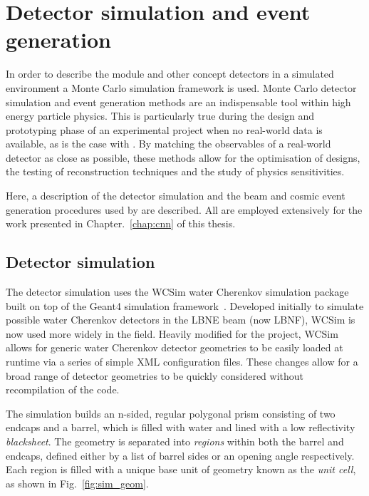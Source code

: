 \section{Detector simulation and event generation} %
\label{sec:chips_monte_carlo} %

In order to describe the \chipsfive module and other \chips concept detectors in a simulated
environment a Monte Carlo simulation framework is used. Monte Carlo detector simulation and event
generation methods are an indispensable tool within high energy particle physics. This is
particularly true during the design and prototyping phase of an experimental project when no
real-world data is available, as is the case with \chips. By matching the observables of a
real-world detector as close as possible, these methods allow for the optimisation of designs, the
testing of reconstruction techniques and the study of physics sensitivities.

Here, a description of the detector simulation and the beam and cosmic event generation procedures
used by \chips are described. All are employed extensively for the work presented in
Chapter.~\ref{chap:cnn} of this thesis.

\subsection{Detector simulation} %
\label{sec:chips_monte_carlo_sim} %

The detector simulation uses the WCSim water Cherenkov simulation package~\cite{wcsim2020} built
on top of the Geant4 simulation framework~\cite{agostinelli2003, allison2006, allison2016}.
Developed initially to simulate possible water Cherenkov detectors in the LBNE beam (now LBNF),
WCSim is now used more widely in the field. Heavily modified for the \chips project, WCSim allows
for generic water Cherenkov detector geometries to be easily loaded at runtime via a series of
simple XML configuration files. These changes allow for a broad range of detector geometries to be
quickly considered without recompilation of the code.

The simulation builds an n-sided, regular polygonal prism consisting of two endcaps and a barrel,
which is filled with water and lined with a low reflectivity \emph{blacksheet}. The geometry is
separated into \emph{regions} within both the barrel and endcaps, defined either by a list of
barrel sides or an opening angle respectively. Each region is filled with a unique base unit of
geometry known as the \emph{unit cell}, as shown in Fig.~\ref{fig:sim_geom}.

